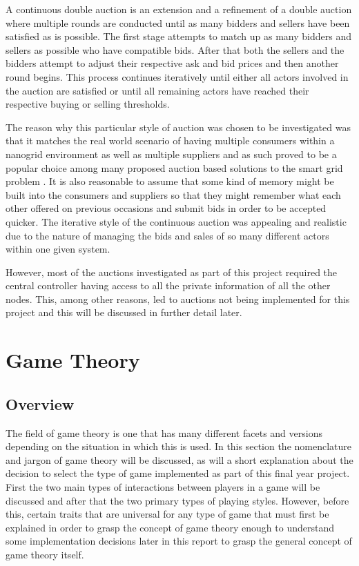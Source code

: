 \documentclass[a4paper, notitlepage]{report}
\begin{document}
A continuous double auction is an extension and a refinement of a double auction
where multiple rounds are conducted until as many bidders and sellers have been
satisfied as is possible. The first stage attempts to match up as many bidders
and sellers as possible who have compatible bids. After that both the sellers
and the bidders attempt to adjust their respective ask and bid prices and then
another round begins. This process continues iteratively until either all actors
involved in the auction are satisfied or until all remaining actors have reached
their respective buying or selling thresholds. 

The reason why this particular style of auction was chosen to be investigated
was that it matches the real world scenario of having multiple consumers within
a nanogrid environment as well as multiple suppliers and as such proved to be a
popular choice among many proposed auction based solutions to the smart grid
problem \cite{ramachandran2011intelligent}. It is also reasonable to
assume that some kind of memory might be built into the consumers and suppliers
so that they might remember what each other offered on previous occasions and
submit bids in order to be accepted quicker. The iterative style of the
continuous auction was appealing and realistic due to the nature of managing the
bids and sales of so many different actors within one given system.

However, most of the auctions investigated as part of this project required the central
controller having access to all the private information of all the other nodes.
This, among other reasons, led to auctions not being implemented for this
project and this will be discussed in further detail later.
\chapter{Game Theory}
\label{sec:org40da697}
\section{Overview}
\label{sec:org7c04d72}
The field of game theory is one that has many different facets and versions
depending on the situation in which this is used. In this section the
nomenclature and jargon of game theory will be discussed, as will a short
explanation about the decision to select the type of game implemented as part of
this final year project. First the two main types of interactions between
players in a game will be discussed and after that the two primary types of
playing styles. However, before this, certain traits that are universal for any
type of game that must first be explained in order to grasp the concept of game
theory enough to understand some implementation decisions later in this report
to grasp the general concept of game theory itself.
\end{document}

